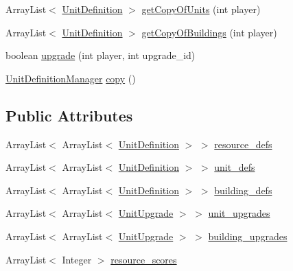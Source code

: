 \begin{DoxyCompactItemize}
ArrayList$<$ \hyperlink{classrts_1_1units_1_1_unit_definition}{UnitDefinition} $>$ \hyperlink{classrts_1_1units_1_1_unit_definition_manager_a4bfde8e84e38f9a093fe27ee1edae0c6}{getCopyOfUnits} (int player)
\item 
ArrayList$<$ \hyperlink{classrts_1_1units_1_1_unit_definition}{UnitDefinition} $>$ \hyperlink{classrts_1_1units_1_1_unit_definition_manager_a6e64a85b51a75a831c6ca607a76de21d}{getCopyOfBuildings} (int player)
\item 
boolean \hyperlink{classrts_1_1units_1_1_unit_definition_manager_a260adc8c2bf00acc471f103e888859b6}{upgrade} (int player, int upgrade\_\-id)
\item 
\hyperlink{classrts_1_1units_1_1_unit_definition_manager}{UnitDefinitionManager} \hyperlink{classrts_1_1units_1_1_unit_definition_manager_aa2c9de51490fd0675747dbef2e9e092a}{copy} ()
\end{DoxyCompactItemize}
\subsection*{Public Attributes}
\begin{DoxyCompactItemize}
\item 
ArrayList$<$ ArrayList$<$ \hyperlink{classrts_1_1units_1_1_unit_definition}{UnitDefinition} $>$ $>$ \hyperlink{classrts_1_1units_1_1_unit_definition_manager_ac16af3c3a81068079d8208ad38a537cd}{resource\_\-defs}
\item 
ArrayList$<$ ArrayList$<$ \hyperlink{classrts_1_1units_1_1_unit_definition}{UnitDefinition} $>$ $>$ \hyperlink{classrts_1_1units_1_1_unit_definition_manager_a408e785a8b3cb7636aa8e6aeb14688af}{unit\_\-defs}
\item 
ArrayList$<$ ArrayList$<$ \hyperlink{classrts_1_1units_1_1_unit_definition}{UnitDefinition} $>$ $>$ \hyperlink{classrts_1_1units_1_1_unit_definition_manager_ab890f3ed15ed6dda066d7d4906e76dff}{building\_\-defs}
\item 
ArrayList$<$ ArrayList$<$ \hyperlink{classrts_1_1units_1_1_unit_upgrade}{UnitUpgrade} $>$ $>$ \hyperlink{classrts_1_1units_1_1_unit_definition_manager_a9816c7d252a85c33bcd6a409657aa769}{unit\_\-upgrades}
\item 
ArrayList$<$ ArrayList$<$ \hyperlink{classrts_1_1units_1_1_unit_upgrade}{UnitUpgrade} $>$ $>$ \hyperlink{classrts_1_1units_1_1_unit_definition_manager_a77bfeba63104aa1bd861ed8d5831542e}{building\_\-upgrades}
\item 
ArrayList$<$ Integer $>$ \hyperlink{classrts_1_1units_1_1_unit_definition_manager_ad7ce99e932a21a2cf931496173b9a67e}{resource\_\-scores}
\end{DoxyCompactItemize}

